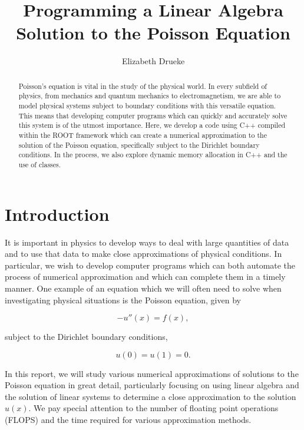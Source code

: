 \documentclass[12pt]{article}
\title{Programming a Linear Algebra Solution to the Poisson Equation}
\author{Elizabeth Drueke}
\numberwithin{equation}{section}
\begin{document}
\maketitle

\begin{abstract}
Poisson's equation is vital in the study of the physical world.  In every subfield of physics, from mechanics and quantum mechanics to electromagnetism, we are able to model physical systems subject to boundary conditions with this versatile equation.  This means that developing computer programs which can quickly and accurately solve this system is of the utmost importance.  Here, we develop a code using C++ compiled within the ROOT framework which can create a numerical approximation to the solution of the Poisson equation, specifically subject to the Dirichlet boundary conditions.  In the process, we also explore dynamic memory allocation in C++ and the use of classes.
\end{abstract}

\section{Introduction}
\label{sec:into}
It is important in physics to develop ways to deal with large quantities of data and to use that data to make close approximations of physical conditions.  In particular, we wish to develop computer programs which can both automate the process of numerical approximation and which can complete them in a timely manner.  One example of an equation which we will often need to solve when investigating physical situations is the Poisson equation, given by 

\begin{equation}
\label{eq:poisson}
-u''\left(x\right) = f\left(x\right),
\end{equation}

\noindent subject to the Dirichlet boundary conditions,

\begin{equation}
\label{eq:dirichlet}
u\left(0\right)=u\left(1\right)=0.
\end{equation}

In this report, we will study various numerical approximations of solutions to the Poisson equation in great detail, particularly focusing on using linear algebra and the solution of linear systems to determine a close approximation to the solution $u\left(x\right)$.  We pay special attention to the number of floating point operations (FLOPS) and the time required for various approximation methods.
\end{document}
